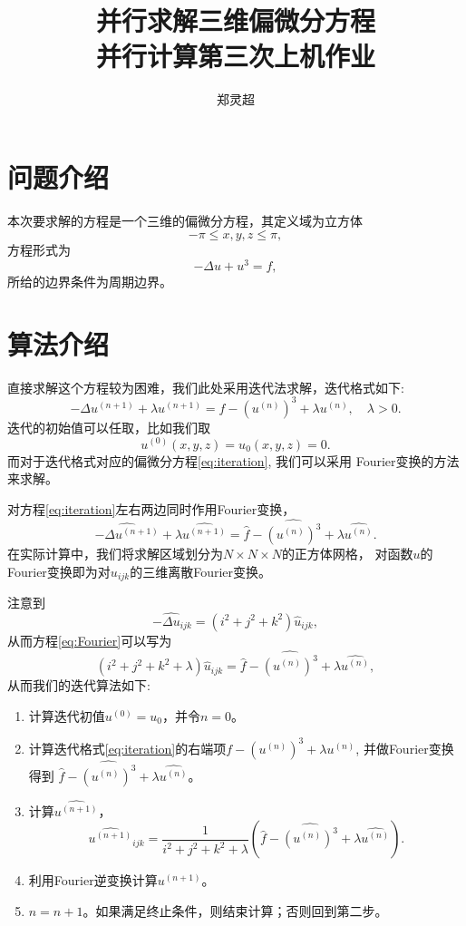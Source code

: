 \documentclass[a4paper,  11pt]{ctexart}
\begin{document}
\title{ {\Huge{并行求解三维偏微分方程}}
\\ 并行计算第三次上机作业}
\author{郑灵超}
\maketitle
\tableofcontents
\newpage
\section{问题介绍}
本次要求解的方程是一个三维的偏微分方程，其定义域为立方体
\[
   -\pi \leq x,y,z \leq \pi,
\]
方程形式为
\begin{equation}
	\label{eq:equation}
	-\Delta u + u^3 = f ,
\end{equation}
所给的边界条件为周期边界。
\section{算法介绍}
直接求解这个方程较为困难，我们此处采用迭代法求解，迭代格式如下:
\begin{equation}
	\label{eq:iteration}
	-\Delta u^{(n+1)} + \lambda u^{(n+1)} = 
	f - (u^{(n)})^3 + \lambda u^{(n)}, 
	\quad \lambda>0.
\end{equation}
迭代的初始值可以任取，比如我们取
\begin{equation}
	\label{eq:u0}
	u^{(0)}(x,y,z)=u_0(x,y,z)=0.
\end{equation}
而对于迭代格式对应的偏微分方程\eqref{eq:iteration}, 我们可以采用
Fourier变换的方法来求解。

对方程\eqref{eq:iteration}左右两边同时作用Fourier变换，
\begin{equation}
	\label{eq:Fourier}
	\widehat{-\Delta u^{(n+1)}} + \lambda \widehat{ u^{(n+1)} }
	=	\widehat{f} - \widehat{(u^{(n)})^3} + \lambda
	\widehat{u^{(n)}}.
\end{equation}
在实际计算中，我们将求解区域划分为$N\times N\times N$的正方体网格，
对函数$u$的Fourier变换即为对$u_{ijk}$的三维离散Fourier变换。

注意到
\begin{equation}
	-\widehat{\Delta u}_{ijk} =
	(i^2+j^2+k^2)\widehat{u}_{ijk}, 
\end{equation}
从而方程\eqref{eq:Fourier}可以写为
\begin{equation}
   (i^2+j^2+k^2+\lambda)\widehat{u}_{ijk}=
		\widehat{f} - \widehat{(u^{(n)})^3} + \lambda
	\widehat{u^{(n)}},
\end{equation}
从而我们的迭代算法如下:
\begin{enumerate}
	\item 计算迭代初值$u^{(0)}=u_0$，并令$n=0$。
	\item 计算迭代格式\eqref{eq:iteration}的右端项$f-(u^{(n)})^3 + 
		\lambda u^{(n)}$, 并做Fourier变换得到
	$	\widehat{f} - \widehat{(u^{(n)})^3} + \lambda
	\widehat{u^{(n)}}$。
\item 计算$\widehat{u^{(n+1)}}$，
	$$
	\widehat{u^{(n+1)}}_{ijk}=\frac{1}{i^2+j^2+k^2+\lambda} 
	(\widehat{f} - \widehat{(u^{(n)})^3} + \lambda
	\widehat{u^{(n)}}).
	$$
\item 利用Fourier逆变换计算$u^{(n+1)}$。
\item $n=n+1$。如果满足终止条件，则结束计算；否则回到第二步。
\end{enumerate}
\end{document}
